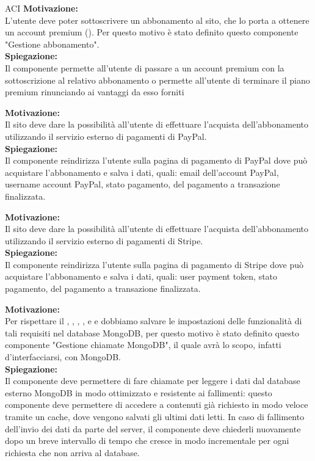 \begin{listaPersonale}{ACI}
    \textbf{Motivazione:}\\
    L'utente deve poter sottoscrivere un abbonamento al sito, che lo porta a ottenere un account premium (). Per questo motivo è stato definito questo componente "Gestione abbonamento".\\
    \textbf{Spiegazione:}\\
    Il componente permette all'utente di passare a un account premium con la sottoscrizione al relativo abbonamento o permette all'utente di terminare il piano premium rinunciando ai vantaggi da esso forniti


    \textbf{Motivazione:}\\
    Il sito deve dare la possibilità all'utente di effettuare l'acquista dell'abbonamento utilizzando il servizio esterno di pagamenti di PayPal.\\
    \textbf{Spiegazione:}\\
    Il componente reindirizza l'utente sulla pagina di pagamento di PayPal dove può acquistare l'abbonamento e salva i dati, quali: email dell'account PayPal, username account PayPal, stato pagamento, del pagamento a transazione finalizzata.


    \textbf{Motivazione:}\\
    Il sito deve dare la possibilità all'utente di effettuare l'acquista dell'abbonamento utilizzando il servizio esterno di pagamenti di Stripe.\\
    \textbf{Spiegazione:}\\
    Il componente reindirizza l'utente sulla pagina di pagamento di Stripe dove può acquistare l'abbonamento e salva i dati, quali: user payment token, stato pagamento, del pagamento a transazione finalizzata.


    \textbf{Motivazione:}\\
    Per rispettare il , , , ,  e  e  dobbiamo salvare le impostazioni delle funzionalità di tali requisiti nel database MongoDB, per questo motivo è stato definito questo componente "Gestione chiamate MongoDB", il quale avrà lo scopo, infatti d'interfacciarsi, con MongoDB.\\
    \textbf{Spiegazione:}\\
    Il componente deve permettere di fare chiamate per leggere i dati dal database esterno MongoDB in modo ottimizzato e resistente ai fallimenti: questo componente deve permettere di accedere a contenuti già richiesto in modo veloce tramite un cache, dove vengono salvati gli ultimi dati letti. In caso di fallimento dell'invio dei dati da parte del server, il componente deve chiederli nuovamente dopo un breve intervallo di tempo che cresce in modo incrementale per ogni richiesta che non arriva al database.



\end{listaPersonale}
